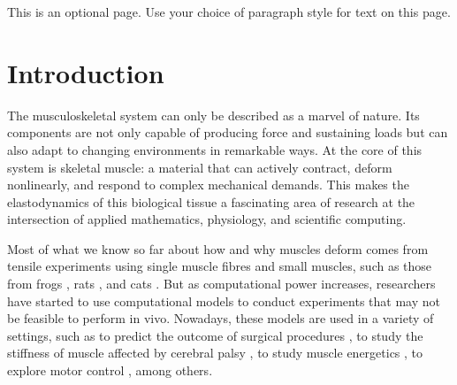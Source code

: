 \documentclass{sfuthesis}
\numberwithin{equation}{section}
\numberwithin{figure}{chapter}
\numberwithin{table}{chapter}
\theoremstyle{definition}
\begin{document}


\begin{acknowledgements}
This is an optional page. Use your choice of paragraph style for text on this page.
\end{acknowledgements}

%
\hypersetup{linkbordercolor=black,hidelinks}
\tableofcontents%
\clearpage

%
\listoftables%
\clearpage

%
\listoffigures%
\clearpage





%
%

\mainmatter%

\chapter{Introduction}

The musculoskeletal system can only be described as a marvel of nature. Its components are not only capable of producing force and sustaining loads but can also adapt to changing environments in remarkable ways. At the core of this system is skeletal muscle: a material that can actively contract, deform nonlinearly, and respond to complex mechanical demands. This makes the elastodynamics of this biological tissue a fascinating area of research at the intersection of applied mathematics, physiology, and scientific computing.

Most of what we know so far about how and why muscles deform comes from tensile experiments using single muscle fibres \cite{Hill1938} and small muscles, such as those from frogs \cite{GordonHuxleyJulian1966,Huxley1957}, 
rats \cite{GillespieEtAl1987}, and cats \cite{RackWestbury1969}. 
But as computational power increases, researchers have started to use computational models to conduct experiments that may not be feasible to perform in vivo. 
Nowadays, these models are used in a variety of settings, such as to predict the outcome of surgical procedures \cite{TigueEtAl2022}, to study the stiffness of muscle affected by cerebral palsy \cite{KonnoEtAl2022_CP}, to study muscle energetics \cite{Paper1_WakelingEtAl2020}, to explore motor control \cite{WalterEtAl2014}, among others.
\end{document}
